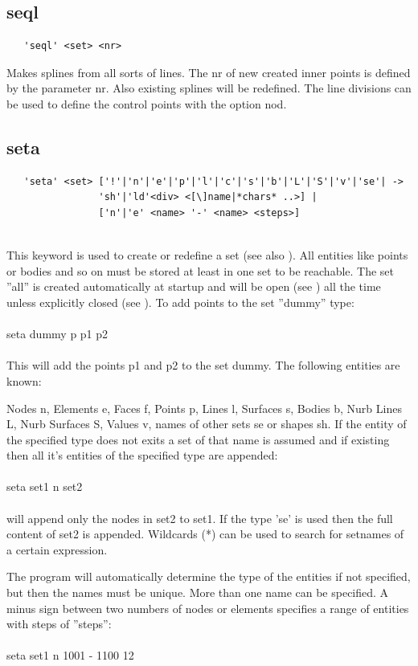 \documentclass{article}
\begin{document}
\subsection{\label{seql}seql}
\begin{verbatim}
   'seql' <set> <nr>
\end{verbatim}
Makes splines from all sorts of lines. The nr of new created inner points is defined by the parameter nr. Also existing splines will be redefined. The line divisions can be used to define the control points with the option nod.

\subsection{\label{seta}seta}
\begin{verbatim}
   'seta' <set> ['!'|'n'|'e'|'p'|'l'|'c'|'s'|'b'|'L'|'S'|'v'|'se'| ->
                'sh'|'ld'<div> <[\]name|*chars* ..>] |
                ['n'|'e' <name> '-' <name> <steps>]
                
\end{verbatim}
This keyword is used to create or redefine a set (see also ). All entities like points or bodies and so on must be stored at least in one set to be reachable. The set ''all'' is created automatically at startup and will be open (see ) all the time unless explicitly closed (see ). To add points to the set ''dummy'' type:\\\\seta dummy p p1 p2\\\\This will add the points p1 and p2 to the set dummy. The following entities are known:

Nodes n, Elements e, Faces f, Points p, Lines l, Surfaces s, Bodies b, Nurb Lines L, Nurb Surfaces S, Values v, names of other sets se or shapes sh. If the entity of the specified type does not exits a set of that name is assumed and if existing then all it's entities of the specified type are appended:\\\\seta set1 n set2\\\\will append only the nodes in set2 to set1. If the type 'se' is used then the full content of set2 is appended. Wildcards (*) can be used to search for setnames of a certain expression.

The program will automatically determine the type of the entities if not specified, but then the names must be unique. More than one name can be specified. A minus sign between two numbers of nodes or elements specifies a range of entities with steps of ''steps'':\\\\seta set1 n 1001 - 1100 12\\\\
\end{document}

